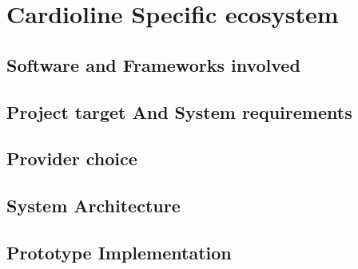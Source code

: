 \chapter{Cardioline Specific ecosystem}
\section{Software and Frameworks involved}
\section{Project target And System requirements}
\section{Provider choice}
\section{System Architecture}
\section{Prototype Implementation}